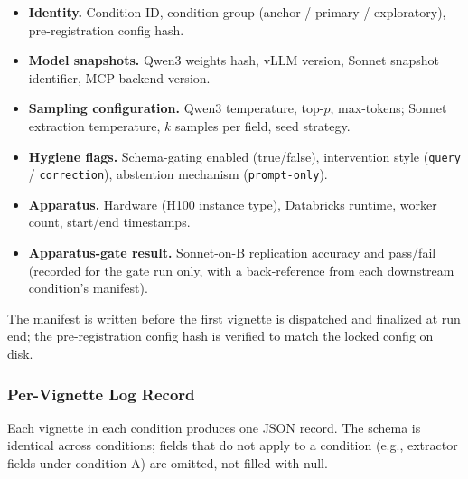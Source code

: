 \begin{itemize}\setlength\itemsep{2pt}
  \item \textbf{Identity.} Condition ID, condition group
        (anchor / primary / exploratory), pre-registration config
        hash.
  \item \textbf{Model snapshots.} Qwen3 weights hash, vLLM version,
        Sonnet snapshot identifier, MCP backend version.
  \item \textbf{Sampling configuration.} Qwen3 temperature, top-$p$,
        max-tokens; Sonnet extraction temperature, $k$ samples per
        field, seed strategy.
  \item \textbf{Hygiene flags.} Schema-gating enabled (true/false),
        intervention style (\texttt{query} / \texttt{correction}),
        abstention mechanism (\texttt{prompt-only}).
  \item \textbf{Apparatus.} Hardware (H100 instance type), Databricks
        runtime, worker count, start/end timestamps.
  \item \textbf{Apparatus-gate result.} Sonnet-on-B replication
        accuracy and pass/fail (recorded for the gate run only, with
        a back-reference from each downstream condition's manifest).
\end{itemize}

The manifest is written before the first vignette is dispatched and
finalized at run end; the pre-registration config hash is verified
to match the locked config on disk.

\subsubsection{Per-Vignette Log Record}

Each vignette in each condition produces one JSON record. The schema
is identical across conditions; fields that do not apply to a
condition (e.g., extractor fields under condition A) are omitted, not
filled with null.

